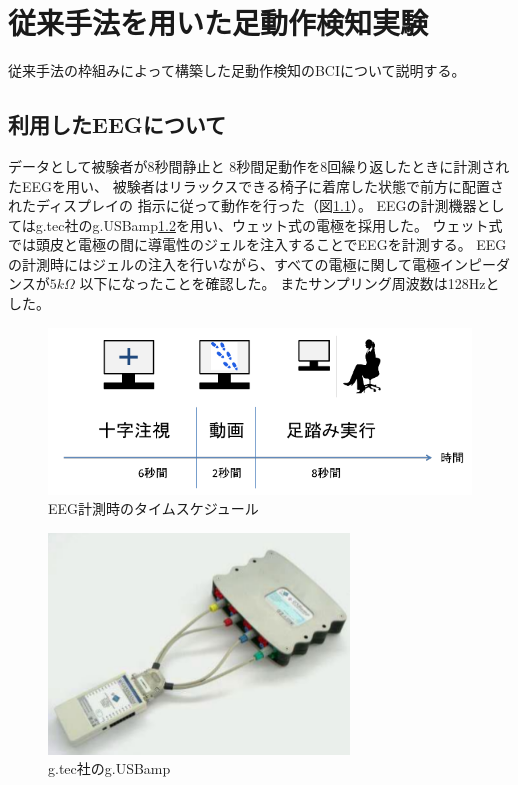 \chapter{従来手法を用いた足動作検知実験}
従来手法の枠組みによって構築した足動作検知のBCIについて説明する。
\section{利用したEEGについて}
データとして被験者が8秒間静止と
8秒間足動作を8回繰り返したときに計測されたEEGを用い、
被験者はリラックスできる椅子に着席した状態で前方に配置されたディスプレイの
指示に従って動作を行った（図\ref{fig:asibumi}）。
EEGの計測機器としてはg.tec社のg.USBamp\ref{fig:usbamp}を用い、ウェット式の電極を採用した。
ウェット式では頭皮と電極の間に導電性のジェルを注入することでEEGを計測する。
EEGの計測時にはジェルの注入を行いながら、すべての電極に関して電極インピーダンスが\(5k\Omega\)
以下になったことを確認した。
またサンプリング周波数は128Hzとした。
\begin{figure}
    \centering
    \includegraphics[width=13cm]{images/asibumi.png}
    \caption{EEG計測時のタイムスケジュール}
    \label{fig:asibumi}
\end{figure}
\begin{figure}
    \centering
    \includegraphics[width=8cm]{images/usbamp.png}
    \caption{g.tec社のg.USBamp}
    \label{fig:usbamp}
\end{figure}

